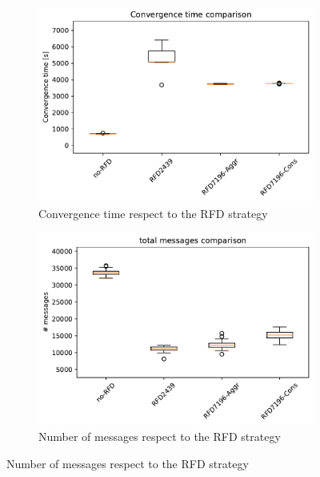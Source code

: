 \begin{figure}[h]
     \centering
     \begin{subfigure}[b]{0.49\textwidth}
         \centering
         \includegraphics[width=\textwidth]{images/RFD/miceVSelephants/elephants/cisco_1000MRAI30_rfd_comparison_time_boxplot.pdf}
         \caption{Convergence time respect to the RFD strategy}
         \label{fig:1000_RFD_MRAI_30_time_elephant}
     \end{subfigure}
     \hfill
     \begin{subfigure}[b]{0.49\textwidth}
         \centering
         \includegraphics[width=\textwidth]{images/RFD/miceVSelephants/elephants/cisco_1000MRAI30_rfd_comparison_messages_boxplot.pdf}
         \caption{Number of messages respect to the RFD strategy}
         \label{fig:1000_RFD_MRAI_30_messages_elephant}

\end{subfigure}
\end{figure}

